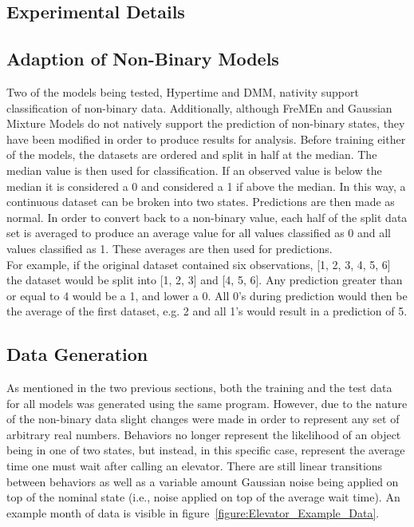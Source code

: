   \subsection{ Experimental Details }

  \subsection{ Adaption of Non-Binary Models }

  Two of the models being tested, Hypertime and DMM, nativity support
  classification of non-binary data. Additionally, although FreMEn and Gaussian Mixture Models
  do not natively support the prediction of non-binary states, they have been
  modified in order to produce results for analysis. Before training either of
  the models, the datasets are ordered and split in half at the median. The
  median value is then used for classification. If an observed value is below
  the median it is considered a 0 and considered a 1 if above the median. In this way, a continuous
  dataset can be broken into two states. Predictions are then made as normal.
  In order to convert back to a non-binary value, each half of the split data
  set is averaged to produce an average value for all values classified as 0 and
  all values classified as 1. These averages are then used for predictions. \\

  For example, if the original dataset contained six observations,
  [1, 2, 3, 4, 5, 6] the dataset would be split into [1, 2, 3] and [4, 5, 6].
  Any prediction greater than or equal to 4 would be a 1, and lower a 0. All 0's during
  prediction would then be the average of the first dataset, e.g. 2 and all
  1's would result in a prediction of 5. \\

  \subsection{ Data Generation }

  As mentioned in the two previous sections, both the training and the test
  data for all models was generated using the same program. However,
  due to the nature of the non-binary data slight changes were made in order
  to represent any set of arbitrary real numbers. Behaviors no longer represent
  the likelihood of an object being in one of two states, but instead, in this
  specific case, represent the average time one must wait after calling an
  elevator. There are still linear transitions between behaviors as well as
  a variable amount Gaussian noise being applied on top of the nominal state
  (i.e., noise applied on top of the average wait time). An example month
  of data is visible in figure~\ref{figure:Elevator_Example_Data}.


